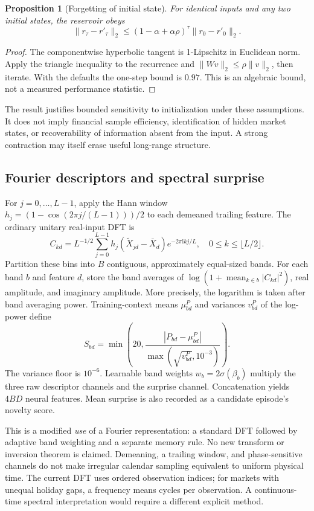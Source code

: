 \documentclass[11pt,a4paper]{article}
\newtheorem{proposition}{Proposition}
\begin{document}
\begin{proposition}[Forgetting of initial state]
For identical inputs and any two initial states, the reservoir obeys
\[
\|r_\tau-r'_\tau\|_2\le(1-\alpha+\alpha\rho)^\tau\|r_0-r'_0\|_2.
\]
\end{proposition}
\begin{proof}
The componentwise hyperbolic tangent is 1-Lipschitz in Euclidean norm. Apply the triangle inequality to the recurrence and $\|Wv\|_2\le\rho\|v\|_2$, then iterate. With the defaults the one-step bound is $0.97$. This is an algebraic bound, not a measured performance statistic.
\end{proof}
The result justifies bounded sensitivity to initialization under these assumptions. It does not imply financial sample efficiency, identification of hidden market states, or recoverability of information absent from the input. A strong contraction may itself erase useful long-range structure.

\subsection{Fourier descriptors and spectral surprise}

For $j=0,\ldots,L-1$, apply the Hann window $h_j=(1-\cos(2\pi j/(L-1)))/2$ to each demeaned trailing feature. The ordinary unitary real-input DFT is
\begin{equation}
C_{kd}=L^{-1/2}\sum_{j=0}^{L-1}h_j(\widetilde X_{jd}-\bar X_d)e^{-2\pi\mathrm{i}kj/L},\quad 0\le k\le\lfloor L/2\rfloor.
\end{equation}
Partition these bins into $B$ contiguous, approximately equal-sized bands. For each band $b$ and feature $d$, store the band averages of $\log(1+\operatorname{mean}_{k\in b}|C_{kd}|^2)$, real amplitude, and imaginary amplitude. More precisely, the logarithm is taken after band averaging power. Training-context means $\mu^P_{bd}$ and variances $v^P_{bd}$ of the log-power define
\begin{equation}
S_{bd}=\min\!\left(20,\frac{|P_{bd}-\mu^P_{bd}|}{\max(\sqrt{v^P_{bd}},10^{-3})}\right).
\end{equation}
The variance floor is $10^{-6}$. Learnable band weights $w_b=2\sigma(\beta_b)$ multiply the three raw descriptor channels and the surprise channel. Concatenation yields $4BD$ neural features. Mean surprise is also recorded as a candidate episode's novelty score.

This is a modified \emph{use} of a Fourier representation: a standard DFT followed by adaptive band weighting and a separate memory rule. No new transform or inversion theorem is claimed. Demeaning, a trailing window, and phase-sensitive channels do not make irregular calendar sampling equivalent to uniform physical time. The current DFT uses ordered observation indices; for markets with unequal holiday gaps, a frequency means cycles per observation. A continuous-time spectral interpretation would require a different explicit method.
\end{document}
